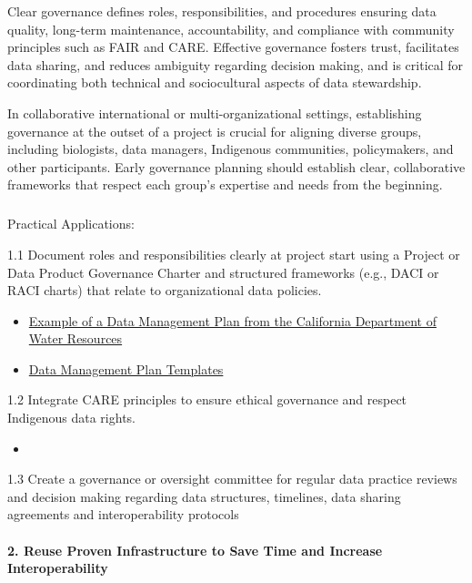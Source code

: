 \documentclass[
  letterpaper,
  DIV=11,
  numbers=noendperiod]{scrartcl}
\makeatletter
\let\oldparagraph\paragraph
\renewcommand{\paragraph}{
    \@ifstar
      \xxxParagraphStar
      \xxxParagraphNoStar
  }
\newcommand{\xxxParagraphStar}[1]{\oldparagraph*{#1}\mbox{}}
\newcommand{\xxxParagraphNoStar}[1]{\oldparagraph{#1}\mbox{}}
\let\oldsubparagraph\subparagraph
\renewcommand{\subparagraph}{
    \@ifstar
      \xxxSubParagraphStar
      \xxxSubParagraphNoStar
  }
\newcommand{\xxxSubParagraphStar}[1]{\oldsubparagraph*{#1}\mbox{}}
\newcommand{\xxxSubParagraphNoStar}[1]{\oldsubparagraph{#1}\mbox{}}
\providecommand{\tightlist}{%
  \setlength{\itemsep}{0pt}\setlength{\parskip}{0pt}}\usepackage{longtable,booktabs,array}
\makeatother
\begin{document}
Clear governance defines roles, responsibilities, and procedures
ensuring data quality, long-term maintenance, accountability, and
compliance with community principles such as FAIR and CARE. Effective
governance fosters trust, facilitates data sharing, and reduces
ambiguity regarding decision making, and is critical for coordinating
both technical and sociocultural aspects of data stewardship.

In collaborative international or multi-organizational settings,
establishing governance at the outset of a project is crucial for
aligning diverse groups, including biologists, data managers, Indigenous
communities, policymakers, and other participants. Early governance
planning should establish clear, collaborative frameworks that respect
each group's expertise and needs from the beginning.~

\subparagraph{Practical Applications:}\label{practical-applications}

1.1 Document roles and responsibilities clearly at project start using a
Project or Data Product Governance Charter and structured frameworks
(e.g., DACI or RACI charts) that relate to organizational data policies.

\begin{itemize}
\item
  \href{https://raw.githubusercontent.com/Br-Johnson/sdm-paper/refs/heads/main/examples/Cal_DMP.pdf}{Example
  of a Data Management Plan from the California Department of Water
  Resources}
\item
  \href{https://dmptool.org/public_templates?page=ALL}{Data Management
  Plan Templates}
\end{itemize}

1.2 Integrate CARE principles to ensure ethical governance and respect
Indigenous data rights.

\begin{itemize}
\tightlist
\item
\end{itemize}

1.3 Create a governance or oversight committee for regular data practice
reviews and decision making regarding data structures, timelines, data
sharing agreements and interoperability protocols

\paragraph{\texorpdfstring{\textbf{2. Reuse Proven Infrastructure to
Save Time and Increase
Interoperability}}{2. Reuse Proven Infrastructure to Save Time and Increase Interoperability}}\label{reuse-proven-infrastructure-to-save-time-and-increase-interoperability}
\end{document}
